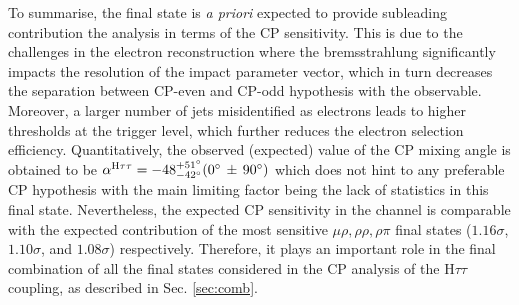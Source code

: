 To summarise, the \et final state is \textit{a priori} expected to provide subleading contribution the analysis in terms of the CP sensitivity. This is due to the challenges in the electron reconstruction where the bremsstrahlung significantly impacts the resolution of the impact parameter vector, which in turn decreases the separation between CP-even and CP-odd hypothesis with the \phicp observable. Moreover, a larger number of jets misidentified as electrons leads to higher \pt thresholds at the trigger level, which further reduces the electron selection efficiency. Quantitatively, the observed (expected) value of the CP mixing angle is obtained to be $\alpha^{\text{H}\tau\tau} = -48^{+51^\circ}_{-42^\circ} (0^\circ \, \pm \, 90^\circ)$ which does not hint to any preferable CP hypothesis with the main limiting factor being the lack of statistics in this final state. Nevertheless, the expected CP sensitivity in the \et channel is comparable with the expected contribution of the most sensitive $\mu\rho, \rho\rho, \rho\pi$ final states ($1.16\sigma$, $1.10\sigma$, and $1.08\sigma$) respectively. Therefore, it plays an important role in the final combination of all the final states considered in the CP analysis of the $\text{H}\tau\tau$ coupling, as described in Sec. \ref{sec:comb}.